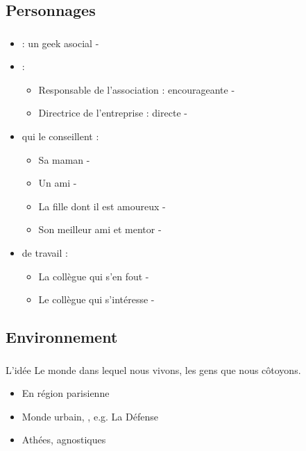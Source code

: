 	\subsection{Personnages}
	
	\begin{frame}
	\frametitle{\insertsubsection}
	
		\begin{itemize}
		\item {} : un geek asocial - 
		\item {} : 
			\begin{itemize}
			\item Responsable de l'association : encourageante  -  
			\item Directrice de l'entreprise : directe - 
			\end{itemize}
		\item {} qui le conseillent :
			\begin{itemize}
			\item Sa maman - 
			\item Un ami - 
			\item La fille dont il est amoureux - 
			\item Son meilleur ami et mentor - 
			\end{itemize}
		\item {} de travail :
			\begin{itemize}
			\item La collègue qui s'en fout - 
			\item Le collègue qui s'intéresse - 
			\end{itemize}
		\end{itemize}
		
	\end{frame}
	
	\subsection{Environnement}
	
	\begin{frame}
	\frametitle{\insertsubsection}
	
		\begin{block}{L'idée}
		Le monde dans lequel nous vivons,
		les gens que nous côtoyons.
		\end{block}
		
		\begin{itemize}
		\item En région parisienne
		\item Monde urbain, , e.g. La Défense
		\item Athées, agnostiques
		\end{itemize}
		
	\end{frame}
	
